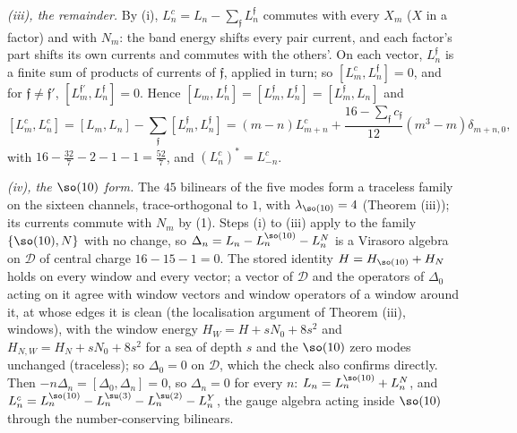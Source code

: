 \emph{(iii), the remainder.} By (i), $L^{c}_{n} = L_{n} - \sum_{\mathfrak{f}}L^{\mathfrak{f}}_{n}$ commutes with every $X_{m}$ ($X$ in a factor) and with $N_{m}$: the band energy shifts every pair current, and each factor's part shifts its own currents and commutes with the others'. On each vector, $L^{\mathfrak{f}}_{n}$ is a finite sum of products of currents of $\mathfrak{f}$, applied in turn; so $[L^{c}_{m}, L^{\mathfrak{f}}_{n}] = 0$, and for $\mathfrak{f} \ne \mathfrak{f}'$, $[L^{\mathfrak{f}'}_{m}, L^{\mathfrak{f}}_{n}] = 0$. Hence $[L_{m}, L^{\mathfrak{f}}_{n}] = [L^{\mathfrak{f}}_{m}, L^{\mathfrak{f}}_{n}] = [L^{\mathfrak{f}}_{m}, L_{n}]$ and
\[
[L^{c}_{m}, L^{c}_{n}] = [L_{m}, L_{n}] - \sum_{\mathfrak{f}}[L^{\mathfrak{f}}_{m}, L^{\mathfrak{f}}_{n}] = (m - n)L^{c}_{m+n} + \frac{16 - \sum_{\mathfrak{f}}c_{\mathfrak{f}}}{12}(m^{3} - m)\delta_{m+n,0},
\]
with $16 - \tfrac{32}{7} - 2 - 1 - 1 = \tfrac{52}{7}$, and $(L^{c}_{n})^{*} = L^{c}_{-n}$.

\emph{(iv), the $\so(10)$ form.} The $45$ bilinears of the five modes form a traceless family on the sixteen channels, trace-orthogonal to $1$, with $\lambda_{\so(10)} = 4$ (Theorem (iii)); its currents commute with $N_{m}$ by (1). Steps (i) to (iii) apply to the family $\{\so(10), N\}$ with no change, so $\Delta_{n} = L_{n} - L^{\so(10)}_{n} - L^{N}_{n}$ is a Virasoro algebra on $\mathcal{D}$ of central charge $16 - 15 - 1 = 0$. The stored identity $H = H_{\so(10)} + H_{N}$ holds on every window and every vector; a vector of $\mathcal{D}$ and the operators of $\Delta_{0}$ acting on it agree with window vectors and window operators of a window around it, at whose edges it is clean (the localisation argument of Theorem (iii), windows), with the window energy $H_{W} = H + sN_{0} + 8s^{2}$ and $H_{N,W} = H_{N} + sN_{0} + 8s^{2}$ for a sea of depth $s$ and the $\so(10)$ zero modes unchanged (traceless); so $\Delta_{0} = 0$ on $\mathcal{D}$, which the check also confirms directly. Then $-n\Delta_{n} = [\Delta_{0}, \Delta_{n}] = 0$, so $\Delta_{n} = 0$ for every $n$: $L_{n} = L^{\so(10)}_{n} + L^{N}_{n}$, and $L^{c}_{n} = L^{\so(10)}_{n} - L^{\su(3)}_{n} - L^{\su(2)}_{n} - L^{Y}_{n}$, the gauge algebra acting inside $\so(10)$ through the number-conserving bilinears.

